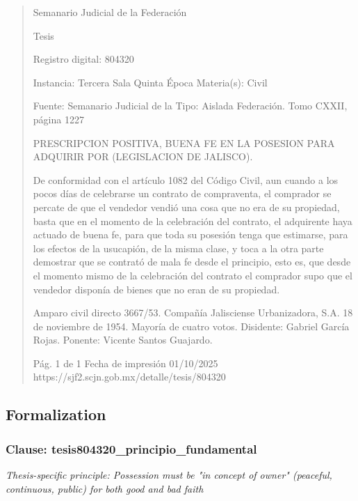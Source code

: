 \documentclass[11pt,a4paper]{article}
\begin{document}
\begin{quote}
                                                   Semanario Judicial de la Federación

                                                  Tesis

 Registro digital: 804320

 Instancia: Tercera Sala          Quinta Época                         Materia(s): Civil

                                  Fuente: Semanario Judicial de la     Tipo: Aislada
                                  Federación.
                                  Tomo CXXII, página 1227


PRESCRIPCION POSITIVA, BUENA FE EN LA POSESION PARA ADQUIRIR POR
(LEGISLACION DE JALISCO).


De conformidad con el artículo 1082 del Código Civil, aun cuando a los pocos días de celebrarse un
contrato de compraventa, el comprador se percate de que el vendedor vendió una cosa que no era
de su propiedad, basta que en el momento de la celebración del contrato, el adquirente haya
actuado de buena fe, para que toda su posesión tenga que estimarse, para los efectos de la
usucapión, de la misma clase, y toca a la otra parte demostrar que se contrató de mala fe desde el
principio, esto es, que desde el momento mismo de la celebración del contrato el comprador supo
que el vendedor disponía de bienes que no eran de su propiedad.


Amparo civil directo 3667/53. Compañía Jalisciense Urbanizadora, S.A. 18 de noviembre de 1954.
Mayoría de cuatro votos. Disidente: Gabriel García Rojas. Ponente: Vicente Santos Guajardo.




                                             Pág. 1 de 1             Fecha de impresión 01/10/2025
  https://sjf2.scjn.gob.mx/detalle/tesis/804320

\end{quote}

\subsection{Formalization}

\subsubsection{Clause: tesis804320\_principio\_fundamental}

\textit{Thesis-specific principle: Possession must be "in concept of owner" (peaceful, continuous, public) for both good and bad faith}
\end{document}
